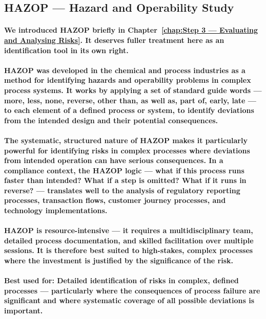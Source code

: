 \subsection{HAZOP — Hazard and Operability Study}
\paragraph{We introduced HAZOP briefly in Chapter~\ref{chap:Step 3 — Evaluating and Analysing Risks}. It deserves fuller treatment here as an identification tool in its own right.}
\paragraph{\textbf{HAZOP} was developed in the chemical and process industries as a method for identifying hazards and operability problems in complex process systems. It works by applying a set of standard guide words — \textbf{more, less, none, reverse, other than, as well as, part of, early, late} — to each element of a defined process or system, to identify deviations from the intended design and their potential consequences.}
\paragraph{The systematic, structured nature of HAZOP makes it particularly powerful for identifying risks in complex processes where deviations from intended operation can have serious consequences. In a compliance context, the HAZOP logic — what if this process runs faster than intended? What if a step is omitted? What if it runs in reverse? — translates well to the analysis of regulatory reporting processes, transaction flows, customer journey processes, and technology implementations.}
\paragraph{HAZOP is resource-intensive — it requires a multidisciplinary team, detailed process documentation, and skilled facilitation over multiple sessions. It is therefore best suited to high-stakes, complex processes where the investment is justified by the significance of the risk.}
\paragraph{\textbf{Best used for}: Detailed identification of risks in complex, defined processes — particularly where the consequences of process failure are significant and where systematic coverage of all possible deviations is important.}
